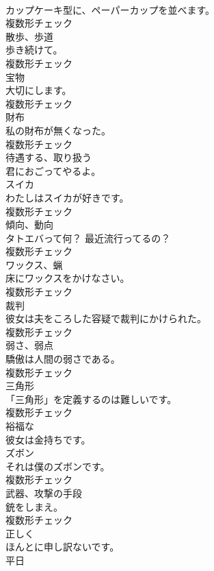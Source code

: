 \documentclass[8pt]{extreport}
\begin{document}
\begin{CJK}{UTF8}{min}
\\	カップケーキ型に、ペーパーカップを並べます。	
\\	複数形チェック
\\	[名詞]	散歩、歩道	
\\	歩き続けて。	
\\	複数形チェック
\\	[名詞]	宝物	
\\	大切にします。	
\\	複数形チェック
\\	[名詞]	財布	
\\	私の財布が無くなった。	
\\	複数形チェック
\\	[動詞]	待遇する、取り扱う	
\\	君におごってやるよ。	
\\	[名詞]	スイカ	
\\	わたしはスイカが好きです。	
\\	複数形チェック
\\	[名詞]	傾向、動向	
\\	タトエバって何？ 最近流行ってるの？	
\\	複数形チェック
\\	[名詞]	ワックス、蝋	
\\	床にワックスをかけなさい。	
\\	複数形チェック
\\	[名詞]	裁判	
\\	彼女は夫をころした容疑で裁判にかけられた。	
\\	複数形チェック
\\	[名詞]	弱さ、弱点	
\\	驕傲は人間の弱さである。	
\\	複数形チェック
\\	[名詞]	三角形	
\\	「三角形」を定義するのは難しいです。	
\\	複数形チェック
\\	[形容詞]	裕福な	
\\	彼女は金持ちです。	
\\	[名詞]	ズボン	
\\	それは僕のズボンです。	
\\	複数形チェック
\\	[名詞]	武器、攻撃の手段	
\\	銃をしまえ。	
\\	複数形チェック
\\	[副詞]	正しく	
\\	ほんとに申し訳ないです。	
\\	[名詞]	平日	

\end{CJK}
\end{document}
